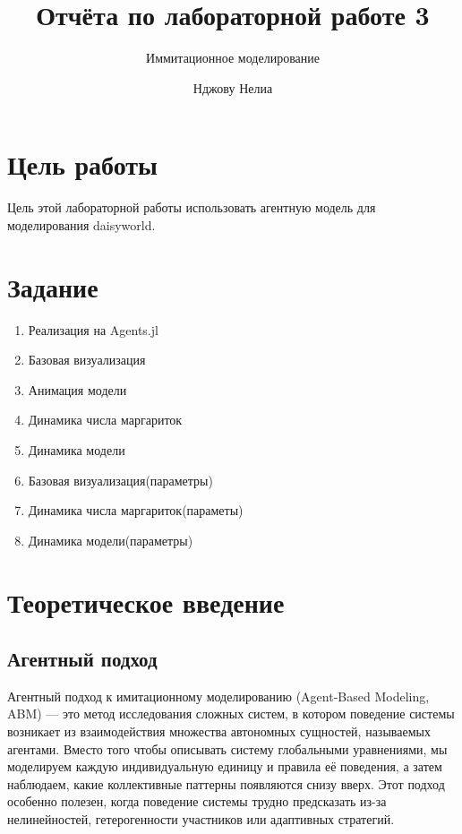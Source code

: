 \documentclass[
  12pt,
  a4paper,
  DIV=11,
  numbers=noendperiod]{scrreprt}
\title{Отчёта по лабораторной работе 3}
\subtitle{Иммитационное моделирование}
\author{Нджову Нелиа}
\date{}
\renewcommand*\contentsname{Содержание}
\newcommand\contentsname{Содержание}
\begin{document}
\maketitle

\renewcommand*\contentsname{Содержание}
{
\setcounter{tocdepth}{1}
\tableofcontents
}
\listoffigures
\listoftables
{}
\chapter{Цель
работы}\label{ux446ux435ux43bux44c-ux440ux430ux431ux43eux442ux44b}

Цель этой лабораторной работы использовать агентную модель для
моделирования daisyworld.

\chapter{Задание}\label{ux437ux430ux434ux430ux43dux438ux435}

\begin{enumerate}
\def\labelenumi{\arabic{enumi}.}
\item
  Реализация на Agents.jl
\item
  Базовая визуализация
\item
  Анимация модели
\item
  Динамика числа маргариток
\item
  Динамика модели
\item
  Базовая визуализация(параметры)
\item
  Динамика числа маргариток(параметы)
\item
  Динамика модели(параметры)
\end{enumerate}

\chapter{Теоретическое
введение}\label{ux442ux435ux43eux440ux435ux442ux438ux447ux435ux441ux43aux43eux435-ux432ux432ux435ux434ux435ux43dux438ux435}

\section{Агентный
подход}\label{ux430ux433ux435ux43dux442ux43dux44bux439-ux43fux43eux434ux445ux43eux434}

Агентный подход к имитационному моделированию (Agent-Based Modeling,
ABM) --- это метод исследования сложных систем, в котором поведение
системы возникает из взаимодействия множества автономных сущностей,
называемых агентами. Вместо того чтобы описывать систему глобальными
уравнениями, мы моделируем каждую индивидуальную единицу и правила её
поведения, а затем наблюдаем, какие коллективные паттерны появляются
снизу вверх. Этот подход особенно полезен, когда поведение системы
трудно предсказать из-за нелинейностей, гетерогенности участников или
адаптивных стратегий.
\end{document}
